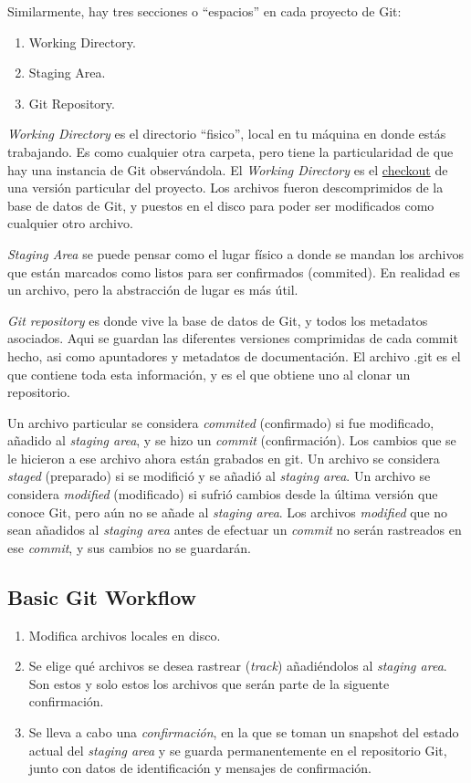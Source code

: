 \documentclass[spanish, 12pt, a4paper]{article}
\begin{document}
Similarmente, hay tres secciones o ``espacios'' en cada proyecto de Git:

\begin{enumerate}
\item
  Working Directory.
\item
  Staging Area.
\item
  Git Repository.
\end{enumerate}

\emph{Working Directory} es el directorio ``fisico'', local en tu
máquina en donde estás trabajando. Es como cualquier otra carpeta, pero
tiene la particularidad de que hay una instancia de Git observándola. El
\emph{Working Directory} es el \underline{checkout} de una versión
particular del proyecto. Los archivos fueron descomprimidos de la base
de datos de Git, y puestos en el disco para poder ser modificados como
cualquier otro archivo.

\emph{Staging Area} se puede pensar como el lugar físico a donde se
mandan los archivos que están marcados como listos para ser confirmados
(commited). En realidad es un archivo, pero la abstracción de lugar es
más útil.

\emph{Git repository} es donde vive la base de datos de Git, y todos los
metadatos asociados. Aqui se guardan las diferentes versiones
comprimidas de cada commit hecho, asi como apuntadores y metadatos de
documentación. El archivo .git es el que contiene toda esta información,
y es el que obtiene uno al clonar un repositorio.

Un archivo particular se considera \emph{commited} (confirmado) si fue
modificado, añadido al \emph{staging area}, y se hizo un \emph{commit}
(confirmación). Los cambios que se le hicieron a ese archivo ahora están
grabados en git. Un archivo se considera \emph{staged} (preparado) si se
modifició y se añadió al \emph{staging area}. Un archivo se considera
\emph{modified} (modificado) si sufrió cambios desde la última versión
que conoce Git, pero aún no se añade al \emph{staging area}. Los
archivos \emph{modified} que no sean añadidos al \emph{staging area}
antes de efectuar un \emph{commit} no serán rastreados en ese
\emph{commit}, y sus cambios no se guardarán.


\subsection{Basic Git Workflow}

\begin{enumerate}
\item
  Modifica archivos locales en disco.
\item
  Se elige qué archivos se desea rastrear (\emph{track}) añadiéndolos al
  \emph{staging area}. Son estos y solo estos los archivos que serán
  parte de la siguente confirmación.
\item
  Se lleva a cabo una \emph{confirmación}, en la que se toman un
  snapshot del estado actual del \emph{staging area} y se guarda
  permanentemente en el repositorio Git, junto con datos de
  identificación y mensajes de confirmación.
\end{enumerate}
\end{document}
